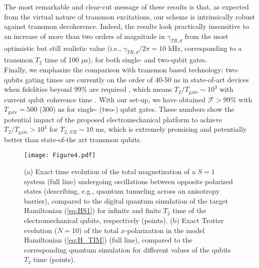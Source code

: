 \documentclass[aps,twocolumn,groupedaddress,superscriptaddress,floatfix,amsmath,amssymb,prb]{revtex4-1}
\begin{document}
The most remarkable and clear-cut message of these results is that, as expected from the virtual nature of transmon excitations, our scheme is intrinsically robust against transmon decoherence. Indeed, the results look practically insensitive to an increase of more than two orders of magnitude in $\gamma_{TR,d}$ from the most optimistic but still realistic \cite{Rigetti2012} value (i.e., $\gamma_{TR,d}/2\pi =10$ kHz, corresponding to a transmon $T_{2}$ time of 100 $\mu$s), for both single- and two-qubit gates. \\
{ Finally, we emphasize the comparison with transmon based technology: two-qubits gating times are currently on the order of 40-50 ns in state-of-art devices  when fidelities beyond 99\% are required \cite{Barends2014}, which means $T_2 / T_{\mathrm{gate}} \sim 10^3$ with current qubit coherence time \cite{Rigetti2012}. With our set-up, we have obtained $\mathcal{F}> 99\%$ with $T_{\mathrm{gate}} = 500$ (300) ns for single- (two-) qubit gates. These numbers show the potential impact of the proposed electromechanical platform to achieve $T_2 / T_{\mathrm{gate}} > 10^4$ for $T_{2,NR}\sim 10$ ms,  which is extremely promising and potentially better than state-of-the art transmon qubits.}



\begin{figure}[t]
\centering
\texttt{[image: Figure4.pdf]} 
\caption{(a) Exact time evolution of the total magnetization of a $S=1$ system (full line) undergoing oscillations between opposite polarized states 
(describing, e.g., quantum tunneling across an anisotropy barrier), compared to the digital quantum simulation of the target Hamiltonian (\ref{eq:HS1}) 
for infinite and finite $T_2$ time of the electromechanical qubits, respectively (points). 
(b) Exact Trotter evolution ($N=10$) of the total $x$-polarization in the model Hamiltonian (\ref{eq:H_TIM}) (full line), compared to the corresponding 
quantum simulation for different values of the qubits $T_2$ time (points). 
}
\label{fig:simulator}
\end{figure}
\end{document}
